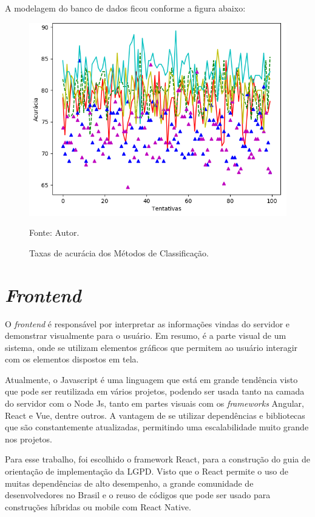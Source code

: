 \documentclass[
	12pt,				%
	openright,			%
	oneside,			%
	a4paper,			%
	english,			%
	french,				%
	spanish,			%
	brazil,				%
	]{abntex2}
\begin{document}
A modelagem do banco de dados ficou conforme a figura abaixo:

\begin{figure}[ht]
    \centering
    \caption{Taxas de acurácia dos Métodos de Classificação.}
    \includegraphics[width=5.0in]{Images/acc-classification.png}
    \label{fig: grafico-acc}
    
    \centering \small Fonte: Autor.
\end{figure}

\section{\textit{Frontend}}

O \textit{frontend} é responsável por interpretar as informações vindas do servidor e demonstrar visualmente para o usuário. Em resumo, é a parte visual de um sistema, onde se utilizam elementos gráficos que permitem ao usuário interagir com os elementos dispostos em tela.

Atualmente, o Javascript é uma linguagem que está em grande tendência visto que pode ser reutilizada em vários projetos, podendo ser usada tanto na camada do servidor com o Node Js, tanto em partes visuais com os \textit{frameworks} Angular, React e Vue, dentre outros. A vantagem de se utilizar dependências e bibliotecas que são constantemente atualizadas, permitindo uma escalabilidade muito grande nos projetos.

Para esse trabalho, foi escolhido o framework React, para a construção do guia de orientação de implementação da LGPD. Visto que o React permite o uso de muitas dependências de alto desempenho, a grande comunidade de desenvolvedores no Brasil e o reuso de códigos que pode ser usado para construções híbridas ou mobile com React Native.
\end{document}
